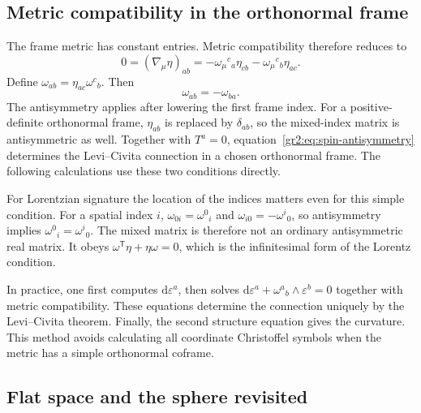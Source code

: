 \documentclass[11pt,a4paper]{article}
\numberwithin{equation}{section}
\newcommand{\dd}{\mathrm d}
\begin{document}
\subsection{Metric compatibility in the orthonormal frame}

The frame metric has constant entries. Metric compatibility therefore
reduces to
\[
 0=(\nabla_\mu\eta)_{ab}
 =-\omega_\mu{}^c{}_a\eta_{cb}
  -\omega_\mu{}^c{}_b\eta_{ac}.
\]
Define \(\omega_{ab}=\eta_{ac}\omega^c{}_b\). Then
\begin{equation}
 \omega_{ab}=-\omega_{ba}.
 \label{gr2:eq:spin-antisymmetry}
\end{equation}
The antisymmetry applies after lowering the first frame index.
For a positive-definite orthonormal frame, \(\eta_{ab}\) is replaced
by \(\delta_{ab}\), so the mixed-index matrix is antisymmetric as well.
Together with \(T^a=0\), equation~\eqref{gr2:eq:spin-antisymmetry}
determines the Levi--Civita connection in a chosen orthonormal frame.
The following calculations use these two conditions directly.

For Lorentzian signature the location of the indices matters even
for this simple condition. For a spatial index \(i\),
\(\omega_{0i}=\omega^0{}_i\) and
\(\omega_{i0}=-\omega^i{}_0\), so antisymmetry implies
\(\omega^0{}_i=\omega^i{}_0\). The mixed matrix is therefore not
an ordinary antisymmetric real matrix. It obeys
\(\omega^{\mathsf T}\eta+\eta\omega=0\), which is the infinitesimal
form of the Lorentz condition.

In practice, one first computes \(\dd\varepsilon^a\), then solves
\(\dd\varepsilon^a+\omega^a{}_b\wedge\varepsilon^b=0\)
together with metric compatibility. These equations determine the
connection uniquely by the Levi--Civita theorem. Finally, the second
structure equation gives the curvature. This method avoids
calculating all coordinate Christoffel symbols when the metric has
a simple orthonormal coframe.

\subsection{Flat space and the sphere revisited}
\end{document}
